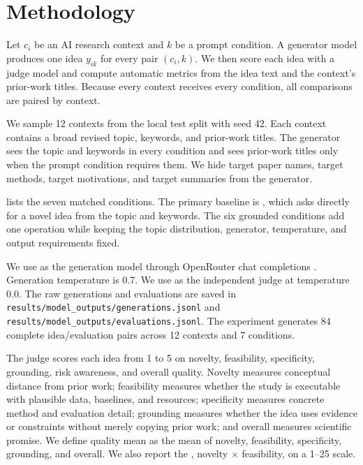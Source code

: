 \section{Methodology}
\label{sec:methodology}

 Let $c_i$ be an AI research context and $k$ be a prompt condition. A generator model produces one idea $y_{ik}$ for every pair $(c_i,k)$. We then score each idea with a judge model and compute automatic metrics from the idea text and the context's prior-work titles. Because every context receives every condition, all comparisons are paired by context.

 We sample 12 contexts from the local \aibidea test split with seed 42. Each context contains a broad revised topic, keywords, and prior-work titles. The generator sees the topic and keywords in every condition and sees prior-work titles only when the prompt condition requires them. We hide target paper names, target methods, target motivations, and target summaries from the generator.

  lists the seven matched conditions. The primary baseline is \ungrounded, which asks directly for a novel idea from the topic and keywords. The six grounded conditions add one operation while keeping the topic distribution, generator, temperature, and output requirements fixed.



 We use \gptmini as the generation model through OpenRouter chat completions \citep{openrouter2026api}. Generation temperature is 0.7. We use \geminiflash as the independent judge at temperature 0.0. The raw generations and evaluations are saved in \texttt{results/model\_outputs/generations.jsonl} and \texttt{results/model\_outputs/evaluations.jsonl}. The experiment generates 84 complete idea/evaluation pairs across 12 contexts and 7 conditions.

 The judge scores each idea from 1 to 5 on novelty, feasibility, specificity, grounding, risk awareness, and overall quality. Novelty measures conceptual distance from prior work; feasibility measures whether the study is executable with plausible data, baselines, and resources; specificity measures concrete method and evaluation detail; grounding measures whether the idea uses evidence or constraints without merely copying prior work; and overall measures scientific promise. We define quality mean as the mean of novelty, feasibility, specificity, grounding, and overall. We also report the \nfprod, novelty $\times$ feasibility, on a 1--25 scale.

